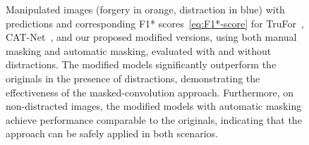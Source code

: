 \begin{figure}[tb]
    \caption{
    Manipulated images (forgery in orange, distraction in blue) with predictions and corresponding F1* scores~\eqref{eq:F1*-score} for TruFor~\cite{TruFor}, CAT-Net~\cite{CAT-Net}, and our proposed modified versions, using both manual masking and automatic masking, evaluated with and without distractions. 
    The modified models significantly outperform the originals in the presence of distractions, demonstrating  the effectiveness of the masked-convolution approach.
    Furthermore, on non-distracted images, the modified models with automatic masking achieve performance comparable to the originals, indicating that the approach can be safely applied in both scenarios.
    }
    \label{figure:evaluation:examples}
\end{figure}
